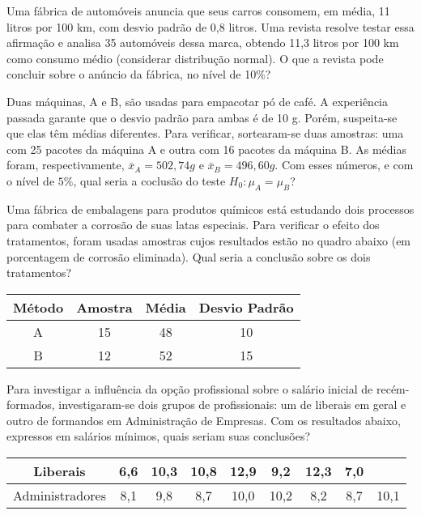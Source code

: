 \documentclass{report}
\begin{document}
\begin{Exercise}
\Question Uma fábrica de automóveis anuncia que seus carros consomem, em média, 11 litros por 100 km, com desvio padrão de 0,8 litros. Uma revista resolve testar essa 
afirmação e analisa 35 automóveis dessa marca, obtendo 11,3 litros por 100 km como consumo médio (considerar distribução normal). O que a revista pode concluir 
sobre o anúncio da fábrica, no nível de 10\%?

\Question Duas máquinas, A e B, são usadas para empacotar pó de café. A experiência passada garante que o desvio padrão para ambas é de 10 g. Porém, suspeita-se 
que elas têm médias diferentes. Para verificar, sortearam-se duas amostras: uma com 25 pacotes da máquina A e outra com 16 pacotes da máquina B. As médias foram, 
respectivamente, $\bar x_A = 502,74g$ e $\bar x_B = 496,60 g$.  Com esses números, e com o nível de $5\%$, qual seria a coclusão do teste $H_0: \mu_A = \mu_B$?

\Question Uma fábrica de embalagens para produtos químicos está estudando dois processos para combater a corrosão de suas latas especiais. Para verificar o efeito dos 
tratamentos, foram usadas amostras cujos resultados estão no quadro abaixo (em porcentagem de corrosão eliminada). Qual seria a conclusão sobre os dois tratamentos?

\begin{tabular}{cccc}\\ \hline
Método & Amostra & Média & Desvio Padrão \\ \hline
A & 15 & 48 & 10 \\
B & 12 & 52 & 15 \\ \hline
\end{tabular}

\Question \item Para investigar a influência da opção profissional sobre o salário inicial de recém-formados, investigaram-se dois grupos de profissionais: um de liberais em geral 
e outro de formandos em Administração de Empresas. Com os resultados abaixo, expressos em salários mínimos, quais seriam suas conclusões?

\begin{tabular}{ccccccccc}\\ \hline
Liberais & 6,6 & 10,3 & 10,8 & 12,9 & 9,2 & 12,3 & 7,0 &  \\ \hline
Administradores & 8,1 & 9,8 & 8,7 & 10,0 & 10,2 & 8,2 & 8,7 & 10,1 \\ \hline
\end{tabular}

\newpage


\end{Exercise}
\end{document}
